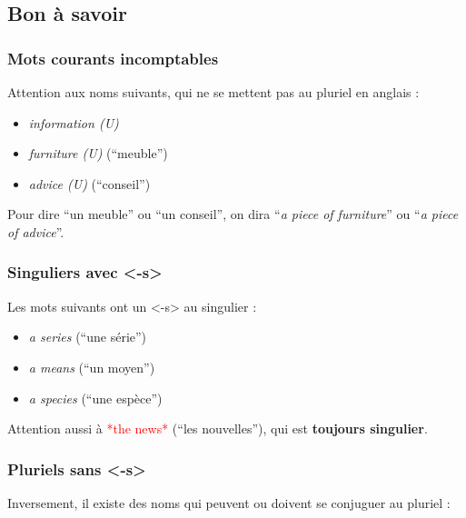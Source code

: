 \documentclass[
  10pt,
]{article}
\providecommand{\tightlist}{%
  \setlength{\itemsep}{0pt}\setlength{\parskip}{0pt}}
\begin{document}
\hypertarget{bon-uxe0-savoir}{%
\subsection{Bon à savoir}\label{bon-uxe0-savoir}}

\hypertarget{mots-courants-incomptables}{%
\subsubsection{Mots courants incomptables}\label{mots-courants-incomptables}}

Attention aux noms suivants, qui ne se mettent pas au pluriel en anglais :

\begin{itemize}
\tightlist
\item
  \emph{information (U)}
\item
  \emph{furniture (U)} (``meuble'')
\item
  \emph{advice (U)} (``conseil'')
\end{itemize}

Pour dire ``un meuble'' ou ``un conseil'', on dira ``\emph{a piece of furniture}'' ou ``\emph{a piece of advice}''.

\hypertarget{singuliers-avec--s}{%
\subsubsection{Singuliers avec \textless-s\textgreater{}}\label{singuliers-avec--s}}

Les mots suivants ont un \textless-s\textgreater{} au singulier :

\begin{itemize}
\tightlist
\item
  \emph{a series} (``une série'')
\item
  \emph{a means} (``un moyen'')
\item
  \emph{a species} (``une espèce'')
\end{itemize}

Attention aussi à \textcolor{red}{*the news*} (``les nouvelles''), qui est \textbf{toujours singulier}.

\hypertarget{pluriels-sans--s}{%
\subsubsection{Pluriels sans \textless-s\textgreater{}}\label{pluriels-sans--s}}

Inversement, il existe des noms qui peuvent ou doivent se conjuguer au pluriel :
\end{document}
